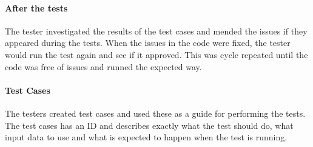 \paragraph{After the tests}
The tester investigated the results of the test cases and mended the issues if they appeared during the tests. When the issues in the code were fixed, the tester would run the test again and see if it approved. This was cycle repeated until the code was free of issues and runned the expected way.\newline

\paragraph{Test Cases}
The testers created test cases and used these as a guide for performing the tests. The test cases has an ID and describes exactly what the test should do, what input data to use and what is expected to happen when the test is running.   

